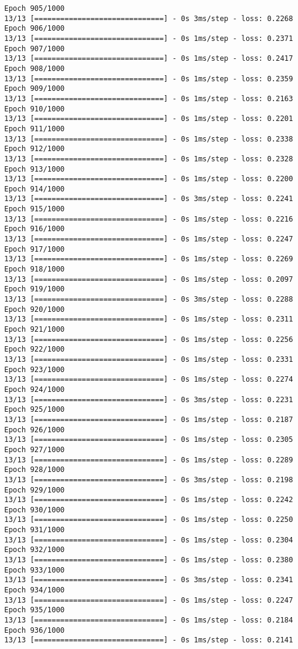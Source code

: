 \documentclass[11pt]{article}
\begin{document}
\begin{Verbatim}[commandchars=\\\{\}]
Epoch 905/1000
13/13 [==============================] - 0s 3ms/step - loss: 0.2268
Epoch 906/1000
13/13 [==============================] - 0s 1ms/step - loss: 0.2371
Epoch 907/1000
13/13 [==============================] - 0s 1ms/step - loss: 0.2417
Epoch 908/1000
13/13 [==============================] - 0s 1ms/step - loss: 0.2359
Epoch 909/1000
13/13 [==============================] - 0s 1ms/step - loss: 0.2163
Epoch 910/1000
13/13 [==============================] - 0s 1ms/step - loss: 0.2201
Epoch 911/1000
13/13 [==============================] - 0s 1ms/step - loss: 0.2338
Epoch 912/1000
13/13 [==============================] - 0s 1ms/step - loss: 0.2328
Epoch 913/1000
13/13 [==============================] - 0s 1ms/step - loss: 0.2200
Epoch 914/1000
13/13 [==============================] - 0s 3ms/step - loss: 0.2241
Epoch 915/1000
13/13 [==============================] - 0s 1ms/step - loss: 0.2216
Epoch 916/1000
13/13 [==============================] - 0s 1ms/step - loss: 0.2247
Epoch 917/1000
13/13 [==============================] - 0s 1ms/step - loss: 0.2269
Epoch 918/1000
13/13 [==============================] - 0s 1ms/step - loss: 0.2097
Epoch 919/1000
13/13 [==============================] - 0s 3ms/step - loss: 0.2288
Epoch 920/1000
13/13 [==============================] - 0s 1ms/step - loss: 0.2311
Epoch 921/1000
13/13 [==============================] - 0s 1ms/step - loss: 0.2256
Epoch 922/1000
13/13 [==============================] - 0s 1ms/step - loss: 0.2331
Epoch 923/1000
13/13 [==============================] - 0s 1ms/step - loss: 0.2274
Epoch 924/1000
13/13 [==============================] - 0s 3ms/step - loss: 0.2231
Epoch 925/1000
13/13 [==============================] - 0s 1ms/step - loss: 0.2187
Epoch 926/1000
13/13 [==============================] - 0s 1ms/step - loss: 0.2305
Epoch 927/1000
13/13 [==============================] - 0s 1ms/step - loss: 0.2289
Epoch 928/1000
13/13 [==============================] - 0s 3ms/step - loss: 0.2198
Epoch 929/1000
13/13 [==============================] - 0s 1ms/step - loss: 0.2242
Epoch 930/1000
13/13 [==============================] - 0s 1ms/step - loss: 0.2250
Epoch 931/1000
13/13 [==============================] - 0s 1ms/step - loss: 0.2304
Epoch 932/1000
13/13 [==============================] - 0s 1ms/step - loss: 0.2380
Epoch 933/1000
13/13 [==============================] - 0s 3ms/step - loss: 0.2341
Epoch 934/1000
13/13 [==============================] - 0s 1ms/step - loss: 0.2247
Epoch 935/1000
13/13 [==============================] - 0s 1ms/step - loss: 0.2184
Epoch 936/1000
13/13 [==============================] - 0s 1ms/step - loss: 0.2141

\end{Verbatim}
\end{document}
